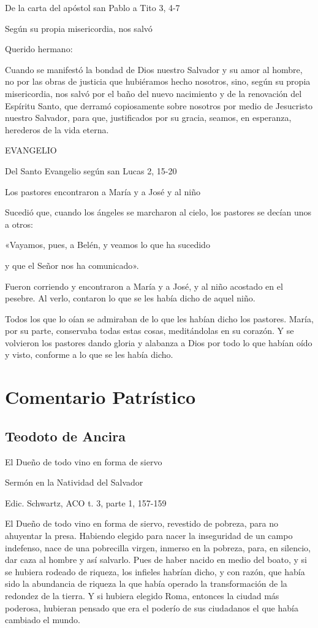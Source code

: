 \begin{body}
\begin{body}
De la carta del apóstol san Pablo a Tito 3, 4-7

Según su propia misericordia, nos salvó

Querido hermano:

Cuando se manifestó la bondad de Dios nuestro Salvador y su amor al
hombre, no por las obras de justicia que hubiéramos hecho nosotros,
sino, según su propia misericordia, nos salvó por el baño del nuevo
nacimiento y de la renovación del Espíritu Santo, que derramó
copiosamente sobre nosotros por medio de Jesucristo nuestro Salvador,
para que, justificados por su gracia, seamos, en esperanza, herederos de
la vida eterna.

EVANGELIO

Del Santo Evangelio según san Lucas 2, 15-20

Los pastores encontraron a María y a José y al niño

Sucedió que, cuando los ángeles se marcharon al cielo, los pastores se
decían unos a otros:

«Vayamos, pues, a Belén, y veamos lo que ha sucedido

y que el Señor nos ha comunicado».

Fueron corriendo y encontraron a María y a José, y al niño acostado en
el pesebre. Al verlo, contaron lo que se les había dicho de aquel niño.

Todos los que lo oían se admiraban de lo que les habían dicho los
pastores. María, por su parte, conservaba todas estas cosas,
meditándolas en su corazón. Y se volvieron los pastores dando gloria y
alabanza a Dios por todo lo que habían oído y visto, conforme a lo que
se les había dicho.

\section{Comentario Patrístico}

\subsection{Teodoto de Ancira}

El Dueño de todo vino en forma de siervo

Sermón en la Natividad del Salvador

Edic. Schwartz, ACO t. 3, parte 1, 157-159

El Dueño de todo vino en forma de siervo, revestido de pobreza, para no ahuyentar la presa. Habiendo elegido para nacer la inseguridad de un campo indefenso, nace de una pobrecilla virgen, inmerso en la pobreza, para, en silencio, dar caza al hombre y así salvarlo. Pues de haber nacido en medio del boato, y si se hubiera rodeado de riqueza, los infieles habrían dicho, y con razón, que había sido la abundancia de riqueza la que había operado la transformación de la redondez de la tierra. Y si hubiera elegido Roma, entonces la ciudad más poderosa, hubieran pensado que era el poderío de sus ciudadanos el que había cambiado el mundo.


\end{body}
\end{body}
